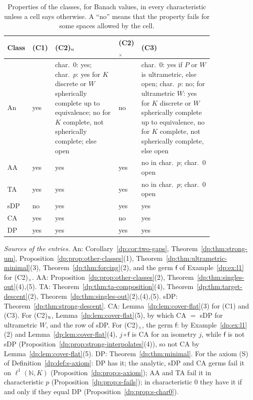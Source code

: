\documentclass[11pt]{amsart}
\theoremstyle{definition}
\theoremstyle{remark}
\numberwithin{equation}{section}
\newcommand{\N}{\mathbb N}
\theoremstyle{plain}
\theoremstyle{definition}
\theoremstyle{plain}
\begin{document}
\begin{table}[htbp]
\small
\caption{Properties of the classes, for Banach values, in every characteristic unless a cell says otherwise. A ``no'' means that the property fails for some spaces allowed by the cell.}\label{dp:s:tab:descents}
\begin{tabular}{@{}p{0.07\linewidth}p{0.06\linewidth}p{0.3\linewidth}p{0.07\linewidth}p{0.34\linewidth}@{}}
Class & (C1) & (C2)$_{\rm u}$ & (C2)$_\times$ & (C3)\\
\hline
An & yes & char.\ $0$: yes; char.\ $p$: yes for $K$ discrete or $W$ spherically complete up to equivalence; no for $K$ complete, not spherically complete; else open & no & char.\ $0$: yes if $P$ or $W$ is ultrametric, else open; char.\ $p$: no; for ultrametric $W$: yes for $K$ discrete or $W$ spherically complete up to equivalence, no for $K$ complete, not spherically complete, else open\\
AA & yes & yes & yes & no in char.\ $p$; char.\ $0$ open\\
TA & yes & yes & yes & no in char.\ $p$; char.\ $0$ open\\
sDP & no & yes & yes & yes\\
CA & yes & yes & no & yes\\
DP & yes & yes & yes & yes\\
\end{tabular}
\end{table}

\emph{Sources of the entries.} An: Corollary~\ref{dp:cor:two-gaps}, Theorem~\ref{dp:thm:strong-um}, Proposition~\ref{dp:prop:other-classes}(1), Theorem~\ref{dp:thm:ultrametric-minimal}(3), Theorem~\ref{dp:thm:forcing}(2), and the germ $\mathsf f$ of Example~\ref{dp:ex:l1} for (C2)$_\times$. AA: Proposition~\ref{dp:prop:other-classes}(2), Theorem~\ref{dp:thm:singles-out}(4),(5). TA: Theorem~\ref{dp:thm:ta-composition}(4), Theorem~\ref{dp:thm:target-descent}(2), Theorem~\ref{dp:thm:singles-out}(2),(4),(5). sDP: Theorem~\ref{dp:thm:strong-descent}. CA: Lemma~\ref{dp:lem:cover-flat}(3) for (C1) and (C3). For (C2)$_{\rm u}$, Lemma~\ref{dp:lem:cover-flat}(5), by which CA $=$ sDP for ultrametric $W$, and the row of sDP. For (C2)$_\times$, the germ $\mathsf f$: by Example~\ref{dp:ex:l1}(2) and Lemma~\ref{dp:lem:cover-flat}(4), $j\circ\mathsf f$ is CA for an isometry $j$, while $\mathsf f$ is not sDP (Proposition~\ref{dp:prop:strong-interpolates}(4)), so not CA by Lemma~\ref{dp:lem:cover-flat}(5). DP: Theorem~\ref{dp:thm:minimal}. For the axiom (S) of Definition~\ref{dp:def:s-axiom}: DP has it; the analytic, sDP and CA germs fail it on $\ell^1(\N,K)$ (Proposition~\ref{dp:prop:s-axiom}); AA and TA fail it in characteristic $p$ (Proposition~\ref{dp:prop:s-fails}); in characteristic $0$ they have it if and only if they equal DP (Proposition~\ref{dp:prop:s-char0}).
\end{document}
